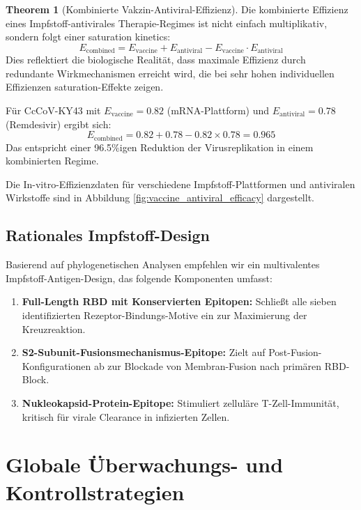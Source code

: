 \documentclass[11pt,a4paper]{article}
\theoremstyle{definition}
\newtheorem{theorem}{Theorem}[section]
\begin{document}
\begin{theorem}[Kombinierte Vakzin-Antiviral-Effizienz]
Die kombinierte Effizienz eines Impfstoff-antivirales Therapie-Regimes ist nicht einfach multiplikativ, sondern folgt einer saturation kinetics:
\[
E_{\text{combined}} = E_{\text{vaccine}} + E_{\text{antiviral}} - E_{\text{vaccine}} \cdot E_{\text{antiviral}}
\]
Dies reflektiert die biologische Realität, dass maximale Effizienz durch redundante Wirkmechanismen erreicht wird, die bei sehr hohen individuellen Effizienzen saturation-Effekte zeigen.

Für CcCoV-KY43 mit $E_{\text{vaccine}} = 0.82$ (mRNA-Plattform) und $E_{\text{antiviral}} = 0.78$ (Remdesivir) ergibt sich:
\[
E_{\text{combined}} = 0.82 + 0.78 - 0.82 \times 0.78 = 0.965
\]
Das entspricht einer 96.5\%igen Reduktion der Virusreplikation in einem kombinierten Regime.
\end{theorem}

Die In-vitro-Effizienzdaten für verschiedene Impfstoff-Plattformen und antiviralen Wirkstoffe sind in Abbildung \ref{fig:vaccine_antiviral_efficacy} dargestellt.

\subsection{Rationales Impfstoff-Design}

Basierend auf phylogenetischen Analysen empfehlen wir ein multivalentes Impfstoff-Antigen-Design, das folgende Komponenten umfasst:

\begin{enumerate}
\item \textbf{Full-Length RBD mit Konservierten Epitopen:} Schließt alle sieben identifizierten Rezeptor-Bindungs-Motive ein zur Maximierung der Kreuzreaktion.

\item \textbf{S2-Subunit-Fusionsmechanismus-Epitope:} Zielt auf Post-Fusion-Konfigurationen ab zur Blockade von Membran-Fusion nach primären RBD-Block.

\item \textbf{Nukleokapsid-Protein-Epitope:} Stimuliert zelluläre T-Zell-Immunität, kritisch für virale Clearance in infizierten Zellen.
\end{enumerate}

\section{Globale Überwachungs- und Kontrollstrategien}
\end{document}
